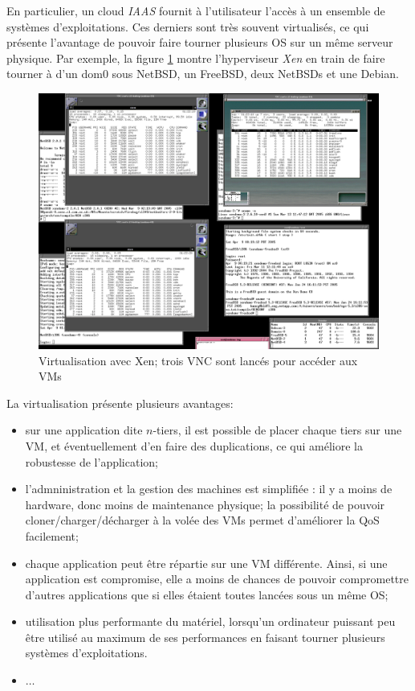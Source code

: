 \documentclass[a4paper]{article}
\begin{document}
En particulier, un cloud \textit{IAAS} fournit à l'utilisateur l'accès
à un ensemble de systèmes d'exploitations. Ces derniers sont très
souvent virtualisés, ce qui présente l'avantage de pouvoir faire tourner
plusieurs OS sur un même serveur physique. Par exemple, la figure
\ref{hubertfxen} montre l'hyperviseur \textit{Xen} en train de faire
tourner à d'un dom$0$ sous NetBSD, un FreeBSD, deux NetBSDs et
une Debian.
\begin{figure}[!ht]
	\centering
	\includegraphics[scale=.17]{imgs/hubertf-xen.png}
	\caption{\label{hubertfxen} Virtualisation avec Xen; trois VNC sont lancés pour accéder aux VMs}
\end{figure}

La virtualisation présente plusieurs avantages:
\begin{itemize}
	\item sur une application dite $n$-tiers, il est possible
	de placer chaque tiers sur une VM, et éventuellement d'en faire
	des duplications, ce qui améliore la robustesse de l'application;
	\item l'admninistration et la gestion des machines est simplifiée :
	il y a moins de hardware, donc moins de maintenance physique;
	la possibilité de pouvoir cloner/charger/décharger à la volée des
	VMs permet d'améliorer la QoS facilement;
	\item chaque application peut être répartie sur une VM différente.
	Ainsi, si une application est compromise, elle a moins de chances
	de pouvoir compromettre d'autres applications que si elles étaient
	toutes lancées sous un même OS;
	\item utilisation plus performante du matériel, lorsqu'un ordinateur
	puissant peu être utilisé au maximum de ses performances en faisant
	tourner plusieurs systèmes d'exploitations.
	\item $\ldots$
\end{itemize}
\end{document}
